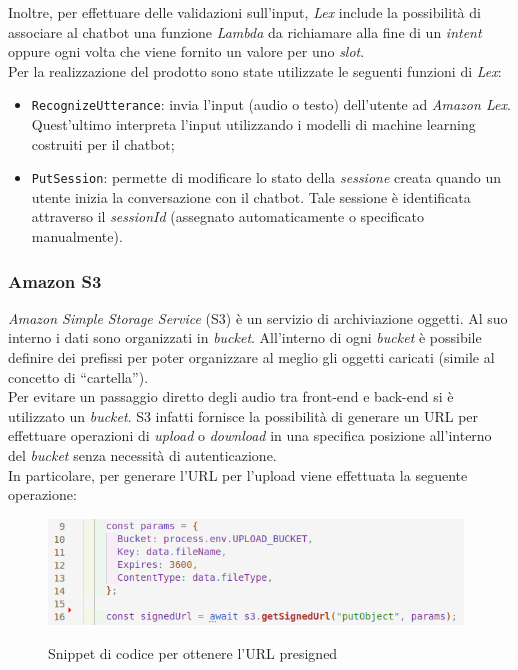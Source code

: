 		\noindent Inoltre, per effettuare delle validazioni sull'input, \emph{Lex} include la possibilità di associare al \gls{chatbot} una funzione \emph{Lambda} da richiamare alla fine di un \emph{intent} oppure ogni volta che viene fornito un valore per uno \emph{slot}. \\
		
		\noindent Per la realizzazione del prodotto sono state utilizzate le seguenti funzioni di \emph{Lex}:
		\begin{itemize}
			\item \texttt{RecognizeUtterance}: invia l'input (audio o testo) dell'utente ad \emph{Amazon Lex}. Quest'ultimo interpreta l'input utilizzando i modelli di machine learning costruiti per il \gls{chatbot};
			
			\item \texttt{PutSession}: permette di modificare lo stato della \emph{sessione} creata quando un utente inizia la conversazione con il \gls{chatbot}. Tale sessione è identificata attraverso il \emph{sessionId} (assegnato automaticamente o specificato manualmente). 
		\end{itemize}
		
		\subsubsection{Amazon S3}
		\emph{Amazon Simple Storage Service} (S3) è un servizio di archiviazione oggetti. Al suo interno i dati sono 
		organizzati in \emph{bucket}. All'interno di ogni \emph{bucket} è possibile definire dei prefissi per poter 
		organizzare al meglio gli oggetti caricati (simile al concetto di ``cartella''). \\ 
		Per evitare un passaggio diretto degli audio tra front-end e back-end si è utilizzato un \emph{bucket}. S3 
		infatti fornisce la possibilità di generare un URL per effettuare operazioni di \emph{upload} o 
		\emph{download} in una specifica posizione all'interno del \emph{bucket} senza necessità di autenticazione. \\ 
		In particolare, per generare l'URL per l'upload viene effettuata la seguente operazione:
		
		\begin{figure}[H]
			\centering
			\includegraphics[width=11cm]{immagini/getURL.png} \\
			\caption{\label{fig:getURLAudio} Snippet di codice per ottenere l'URL presigned}
		\end{figure}
		

